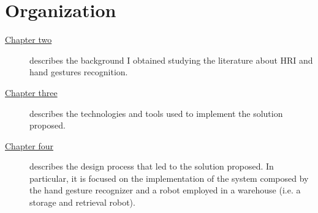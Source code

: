 \documentclass[../thesis.tex]{subfiles}
\begin{document}
\section{Organization}\label{s:organization}
\begin{description}
    \item[{\hyperref[cap:background]{Chapter two}}] describes the background I obtained studying the literature about \acrlong{HRI} and hand gestures recognition.
    \item[{\hyperref[cap:technologies-and-tools]{Chapter three}}] describes the technologies and tools used to implement the solution proposed.
    \item[{\hyperref[cap:system-design-and-implementation]{Chapter four}}] describes the design process that led to the solution proposed. In particular, it is focused on the implementation of the system composed by the hand gesture recognizer and a robot employed in a warehouse (i.e. a storage and retrieval robot).
\end{description}
\end{document}
